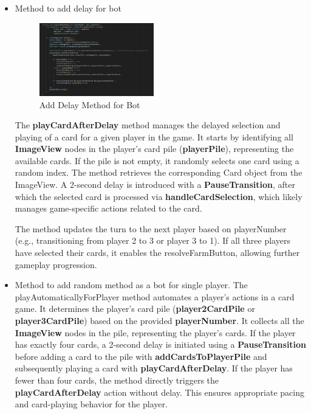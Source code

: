\documentclass[conference]{IEEEtran}
\begin{document}
\begin{itemize}
    \item Method to add delay for bot 
    \begin{figure}[h!]
        \centering
        \includegraphics[width=0.47\textwidth]{img/Screenshot 2025-01-17 151752.png} %
        \caption{Add Delay Method for Bot}
        \label{fig:case}
    \end{figure}

    The \textbf{playCardAfterDelay} method manages the delayed selection and playing of a card for a given player in the game. It starts by identifying all \textbf{ImageView} nodes in the player's card pile (\textbf{playerPile}), representing the available cards. If the pile is not empty, it randomly selects one card using a random index. The method retrieves the corresponding Card object from the ImageView. A 2-second delay is introduced with a \textbf{PauseTransition}, after which the selected card is processed via \textbf{handleCardSelection}, which likely manages game-specific actions related to the card.

    The method updates the turn to the next player based on playerNumber (e.g., transitioning from player 2 to 3 or player 3 to 1). If all three players have selected their cards, it enables the resolveFarmButton, allowing further gameplay progression.

    \newpage

    
    \item Method to add random method as a bot for single player.
    The playAutomaticallyForPlayer method automates a player's actions in a card game. It determines the player's card pile (\textbf{player2CardPile} or \textbf{player3CardPile}) based on the provided \textbf{playerNumber}. It collects all the \textbf{ImageView} nodes in the pile, representing the player's cards. If the player has exactly four cards, a 2-second delay is initiated using a \textbf{PauseTransition} before adding a card to the pile with \textbf{addCardsToPlayerPile} and subsequently playing a card with \textbf{playCardAfterDelay}. If the player has fewer than four cards, the method directly triggers the \textbf{playCardAfterDelay} action without delay. This ensures appropriate pacing and card-playing behavior for the player.


\end{itemize}
\end{document}
